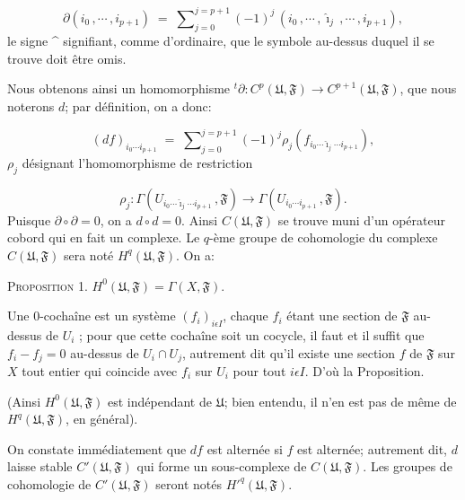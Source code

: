 \begin{equation*}
\partial(i_{0}\,, \cdots\,, i_{p+1}) \;=\; \sum\nolimits_{j=0}^{j=p+1} (-1)^{j}\, (i_{0}\,, \cdots\,, \hat{\imath}_{j}\,, \cdots\,, i_{p+1}),
\end{equation*}
le signe \^{} signifiant, comme d'ordinaire, que le symbole au-dessus duquel il se trouve doit être omis.

Nous obtenons ainsi un homomorphisme ${}^{t}\partial : C^{p}(\mathfrak{U}, \mathfrak{F}) \to C^{p+1}(\mathfrak{U}, \mathfrak{F})$, que nous noterons $d$; par définition, on a donc:

\begin{equation*}
(df)_{i_{0} \cdots i_{p+1}} \;=\; \sum\nolimits_{j=0}^{j=p+1} (-1)^{j}\rho_{j}(f_{i_{0} \cdots \hat{\imath}_{j} \cdots i_{p+1}}),
\end{equation*}
$\rho_{j}$ désignant l'homomorphisme de restriction

\begin{equation*}
\rho_{j} : \Gamma(U_{i_{0} \cdots \hat{\imath}_{j} \cdots i_{p+1}}\,, \mathfrak{F}) \to \Gamma(U_{i_{0} \cdots i_{p+1}}\,, \mathfrak{F}).
\end{equation*}
Puisque $\partial \circ \partial = 0$, on a $d \circ d = 0$. Ainsi $C(\mathfrak{U}, \mathfrak{F})$ se trouve muni d'un opérateur cobord qui en fait un complexe. Le $q$-ème groupe de cohomologie du complexe $C(\mathfrak{U}, \mathfrak{F})$ sera noté $H^{q}(\mathfrak{U}, \mathfrak{F})$. On a:

\textsc{Proposition} 1. $H^{0}(\mathfrak{U}, \mathfrak{F}) = \Gamma(X, \mathfrak{F})$.

Une 0-cochaîne est un système $(f_{i})_{i \epsilon I}$, chaque $f_{i}$ étant une section de $\mathfrak{F}$ au-dessus de $U_{i}$ ; pour que cette cochaîne soit un cocycle, il faut et il suffit que $f_{i} - f_{j} = 0$ au-dessus de $U_{i} \cap U_{j}$, autrement dit qu'il existe une section $f$ de $\mathfrak{F}$ sur $X$ tout entier qui coincide avec $f_{i}$ sur $U_{i}$ pour tout $i \epsilon I$. D'où la Proposition.

(Ainsi $H^{0}(\mathfrak{U}, \mathfrak{F})$ est indépendant de $\mathfrak{U}$; bien entendu, il n'en est pas de même de $H^{q}(\mathfrak{U}, \mathfrak{F})$, en général).

On constate immédiatement que $df$ est alternée si $f$ est alternée; autrement dit, $d$ laisse stable $C'(\mathfrak{U}, \mathfrak{F})$ qui forme un sous-complexe de $C(\mathfrak{U}, \mathfrak{F})$. Les groupes de cohomologie de $C'(\mathfrak{U}, \mathfrak{F})$ seront notés $H'^{q}(\mathfrak{U}, \mathfrak{F})$.


